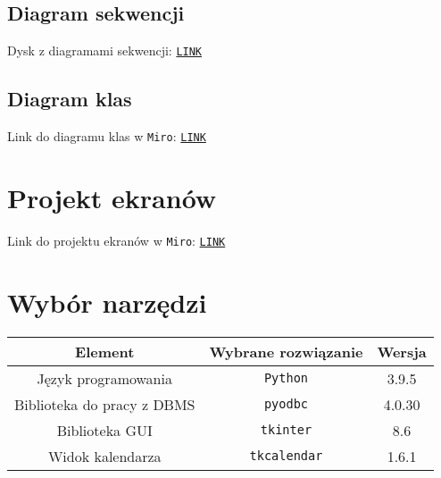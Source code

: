 \documentclass[8pt]{article}
\begin{document}
\pagebreak %

\subsection{Diagram sekwencji}
Dysk z diagramami sekwencji: \texttt{\href{https://drive.google.com/drive/folders/1AHW_von91aril9y62uCa9vJiyDRlB0I8?usp=sharing}{LINK}}

\subsection{Diagram klas}
Link do diagramu klas w \texttt{Miro}: \texttt{\href{https://miro.com/app/board/o9J_lL81GTA=/}{LINK}}

\section{Projekt ekranów}
Link do projektu ekranów w \texttt{Miro}: \texttt{\href{https://miro.com/welcomeonboard/SLn3IxMquzxConVpUMeYinhwTCstNizbIMqoJ5DmRT7SJ334ayztDhFYqNAvMOP7}{LINK}}

\section{Wybór narzędzi}
\begin{table}[h!]
    \begin{center}
        \begin{tabular}{c|c|c}
            Element & Wybrane rozwiązanie & Wersja \\
            \hline
            Język programowania & \texttt{Python} & 3.9.5 \\
            Biblioteka do pracy z DBMS & \texttt{pyodbc} & 4.0.30 \\
            Biblioteka GUI & \texttt{tkinter} & 8.6 \\
            Widok kalendarza & \texttt{tkcalendar} & 1.6.1
        \end{tabular}
    \end{center}
\end{table}
\end{document}
